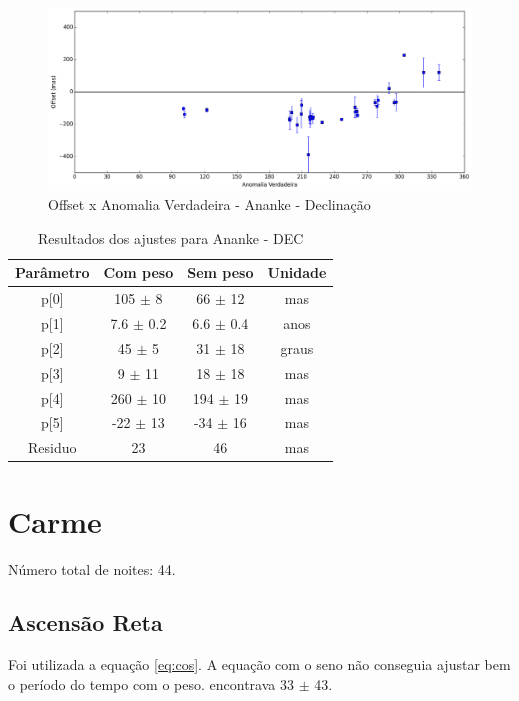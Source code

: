 \documentclass[11pt,a4paper]{report}
\begin{document}
\begin{figure}[h]
\caption{Offset x Anomalia Verdadeira - Ananke - Declinação}
\includegraphics[scale=0.45]{Ananke/DEC_anom.png}  
\end{figure}

\begin{table}[h!]
\caption{\label{Tab: Ananke-DEC} Resultados dos ajustes para Ananke - DEC}
\begin{centering}
\begin{tabular}{cccc}
\hline
\hline
Parâmetro & Com peso & Sem peso & Unidade\tabularnewline
\hline
p[0] & 105 $\pm$ 8 & 66 $\pm$ 12 & mas\\
p[1] & 7.6 $\pm$ 0.2 & 6.6 $\pm$ 0.4 & anos\\
p[2] & 45 $\pm$ 5 & 31 $\pm$ 18 & graus\\
p[3] & 9 $\pm$ 11 & 18 $\pm$ 18 & mas\\
p[4] & 260 $\pm$ 10 & 194 $\pm$ 19 & mas\\
p[5] & -22 $\pm$ 13 & -34 $\pm$ 16 & mas\\
Residuo & 23 & 46 & mas\\
\hline 
\end{tabular} 
\par\end{centering}
\end{table}

\chapter*{Carme}

\indent \indent Número total de noites: 44.

\section*{Ascensão Reta}

Foi utilizada a equação \ref{eq:cos}. A equação com o seno não conseguia ajustar bem o período do tempo com o peso. encontrava 33 $\pm$ 43.
\end{document}
